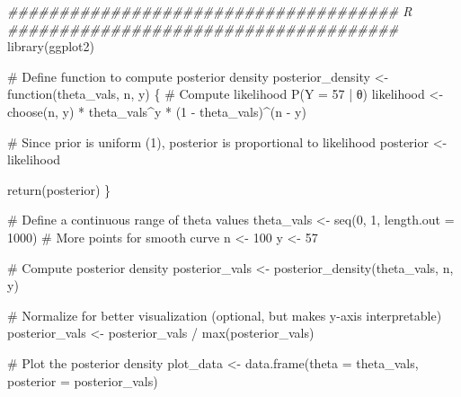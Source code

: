 \documentclass[
  letterpaper,
  DIV=11,
  numbers=noendperiod]{scrartcl}
\newenvironment{Shaded}{\begin{snugshade}}{\end{snugshade}}
\newcommand{\AttributeTok}[1]{\textcolor[rgb]{0.40,0.45,0.13}{#1}}
\newcommand{\CommentTok}[1]{\textcolor[rgb]{0.37,0.37,0.37}{#1}}
\newcommand{\ControlFlowTok}[1]{\textcolor[rgb]{0.00,0.23,0.31}{#1}}
\newcommand{\DecValTok}[1]{\textcolor[rgb]{0.68,0.00,0.00}{#1}}
\newcommand{\DocumentationTok}[1]{\textcolor[rgb]{0.37,0.37,0.37}{\textit{#1}}}
\newcommand{\FunctionTok}[1]{\textcolor[rgb]{0.28,0.35,0.67}{#1}}
\newcommand{\NormalTok}[1]{\textcolor[rgb]{0.00,0.23,0.31}{#1}}
\newcommand{\OtherTok}[1]{\textcolor[rgb]{0.00,0.23,0.31}{#1}}
\newcommand{\SpecialCharTok}[1]{\textcolor[rgb]{0.37,0.37,0.37}{#1}}
\begin{document}
\begin{Shaded}
\begin{Highlighting}[]
\DocumentationTok{\#\#\#\#\#\#\#\#\#\#\#\#\#\#\#\#\#\#\#\#\#\#\#\#\#\#\#\#\#\#\#\#\#\#\#\#\#\# R \#\#\#\#\#\#\#\#\#\#\#\#\#\#\#\#\#\#\#\#\#\#\#\#\#\#\#\#\#\#\#\#\#\#\#\#\#\#}
\FunctionTok{library}\NormalTok{(ggplot2)}

\CommentTok{\# Define function to compute posterior density}
\NormalTok{posterior\_density }\OtherTok{\textless{}{-}} \ControlFlowTok{function}\NormalTok{(theta\_vals, n, y) \{}
    \CommentTok{\# Compute likelihood P(Y = 57 | θ)}
\NormalTok{    likelihood }\OtherTok{\textless{}{-}} \FunctionTok{choose}\NormalTok{(n, y) }\SpecialCharTok{*}\NormalTok{ theta\_vals}\SpecialCharTok{\^{}}\NormalTok{y }\SpecialCharTok{*}\NormalTok{ (}\DecValTok{1} \SpecialCharTok{{-}}\NormalTok{ theta\_vals)}\SpecialCharTok{\^{}}\NormalTok{(n }\SpecialCharTok{{-}}\NormalTok{ y)}

    \CommentTok{\# Since prior is uniform (1), posterior is proportional to likelihood}
\NormalTok{    posterior }\OtherTok{\textless{}{-}}\NormalTok{ likelihood}

    \FunctionTok{return}\NormalTok{(posterior)}
\NormalTok{\}}

\CommentTok{\# Define a continuous range of theta values}
\NormalTok{theta\_vals }\OtherTok{\textless{}{-}} \FunctionTok{seq}\NormalTok{(}\DecValTok{0}\NormalTok{, }\DecValTok{1}\NormalTok{, }\AttributeTok{length.out =} \DecValTok{1000}\NormalTok{) }\CommentTok{\# More points for smooth curve}
\NormalTok{n }\OtherTok{\textless{}{-}} \DecValTok{100}
\NormalTok{y }\OtherTok{\textless{}{-}} \DecValTok{57}

\CommentTok{\# Compute posterior density}
\NormalTok{posterior\_vals }\OtherTok{\textless{}{-}} \FunctionTok{posterior\_density}\NormalTok{(theta\_vals, n, y)}

\CommentTok{\# Normalize for better visualization (optional, but makes y{-}axis interpretable)}
\NormalTok{posterior\_vals }\OtherTok{\textless{}{-}}\NormalTok{ posterior\_vals }\SpecialCharTok{/} \FunctionTok{max}\NormalTok{(posterior\_vals)}

\CommentTok{\# Plot the posterior density}
\NormalTok{plot\_data }\OtherTok{\textless{}{-}} \FunctionTok{data.frame}\NormalTok{(}\AttributeTok{theta =}\NormalTok{ theta\_vals, }\AttributeTok{posterior =}\NormalTok{ posterior\_vals)}


\end{Highlighting}
\end{Shaded}
\end{document}
